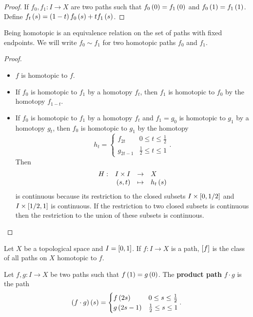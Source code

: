 \begin{proof}
If $ f_0, f_1 : I \to X $ are two paths such that $ f_0\rb{0} = f_1\rb{0} $ and $ f_0\rb{1} = f_1\rb{1} $. Define $ f_t\rb{s} = \rb{1 - t}f_0\rb{s} + tf_1\rb{s} $.
\end{proof}

\begin{lemma}
Being homotopic is an equivalence relation on the set of paths with fixed endpoints. We will write $ f_0 \sim f_1 $ for two homotopic paths $ f_0 $ and $ f_1 $.
\end{lemma}

\begin{proof}
\hfill
\begin{itemize}
\item $ f $ is homotopic to $ f $.
\item If $ f_0 $ is homotopic to $ f_1 $ by a homotopy $ f_t $, then $ f_1 $ is homotopic to $ f_0 $ by the homotopy $ f_{1 - t} $.
\item If $ f_0 $ is homotopic to $ f_1 $ by a homotopy $ f_t $ and $ f_1 = g_0 $ is homotopic to $ g_1 $ by a homotopy $ g_t $, then $ f_0 $ is homotopic to $ g_1 $ by the homotopy
$$ h_t =
\begin{cases}
f_{2t} & 0 \le t \le \tfrac{1}{2} \\
g_{2t - 1} & \tfrac{1}{2} \le t \le 1
\end{cases}.
$$
Then
$$ \function[H]{I \times I}{X}{\rb{s, t}}{h_t\rb{s}} $$
is continuous because its restriction to the closed subsets $ I \times \sb{0, 1 / 2} $ and $ I \times \sb{1 / 2, 1} $ is continuous. If the restriction to two closed subsets is continuous then the restriction to the union of these subsets is continuous.
\end{itemize}
\end{proof}


Let $ X $ be a topological space and $ I = \sb{0, 1} $. If $ f : I \to X $ is a path, $ \sb{f} $ is the class of all paths on $ X $ homotopic to $ f $.

\begin{definition}
Let $ f, g : I \to X $ be two paths such that $ f\rb{1} = g\rb{0} $. The \textbf{product path} $ f \cdot g $ is the path
$$ \rb{f \cdot g}\rb{s} =
\begin{cases}
f\rb{2s} & 0 \le s \le \tfrac{1}{2} \\
g\rb{2s - 1} & \tfrac{1}{2} \le s \le 1
\end{cases}.
$$
\end{definition}

